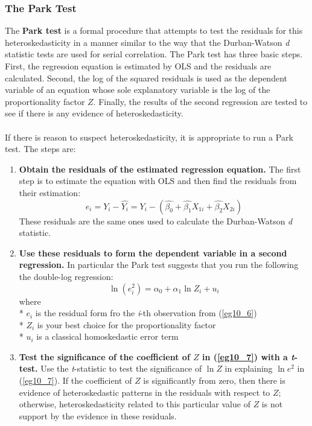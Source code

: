 \documentclass[11pt]{article}
\begin{document}
\subsubsection{The Park Test}
The \textbf{Park test} is a formal procedure that attempts to test the residuals for this heteroskedasticity in a manner similar to the way that the Durban-Watson \textit{d} statistic tests are used for serial correlation. The Park test has three basic steps. First, the regression equation is estimated by OLS and the residuals are calculated. Second, the log of the squared residuals is used as the dependent variable of an equation whose sole explanatory variable is the log of the proportionality factor $Z$. Finally, the results of the second regression are tested to see if there is any evidence of heteroskedasticity. \\ \\
If there is reason to suspect heteroskedasticity, it is appropriate to run a Park test. The steps are:
\begin{enumerate}
\item \textbf{Obtain the residuals of the estimated regression equation.} The first step is to estimate the equation with OLS and then find the residuals from their estimation:
\begin{equation}
e_i = Y_i - \hat{Y_i} = Y_i - (\hat{\beta_0} + \hat{\beta_1}X_{1i} + \hat{\beta_2}X_{2i}) \label{eg10_6}
\end{equation}
These residuals are the same ones used to calculate the Durban-Watson \textit{d} statistic.
\item \textbf{Use these residuals to form the dependent variable in a second regression.} In particular the Park test suggests that you run the following the double-log regression:
\begin{equation}
\ln (e_i^2)=\alpha_0 +\alpha_1 \ln Z_i + u_i \label{eg10_7}
\end{equation}
where\\*
$e_i$ is the residual form fro the \textit{i}-th observation from (\ref{eg10_6})\\*
$Z_i$ is your best choice for the proportionality factor\\*
$u_i$ is a classical homoskedastic error term
\item \textbf{Test the significance of the coefficient of $Z$ in (\ref{eg10_7}) with a \textit{t}-test.} Use the \textit{t}-statistic to test the significance of $\ln Z$ in explaining $\ln e^2$ in (\ref{eg10_7}). If the coefficient of $Z$ is significantly from zero, then there is evidence of heteroskedastic patterns in the residuals with respect to $Z$; otherwise, heteroskedasticity related to this particular value of $Z$ is not support by the evidence in these residuals. 
\end{enumerate}
\end{document}
